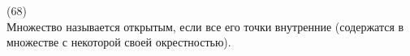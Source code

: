 (68)\\
Множество называется открытым, если все его точки внутренние (содержатся в множестве с некоторой своей окрестностью).